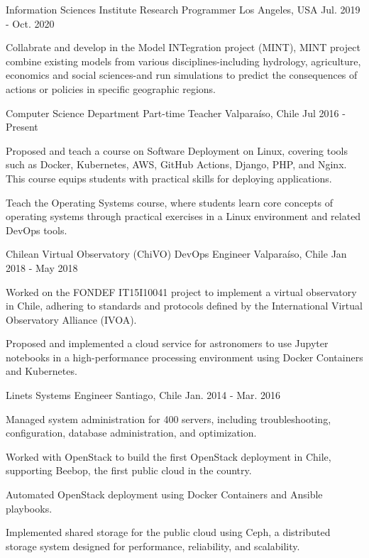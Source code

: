 \begin{cventries}
  \cventry
    {Information Sciences Institute}
    {Research Programmer}
    {Los Angeles, USA}
    {Jul. 2019 - Oct. 2020}
    {
      \begin{cvitems}
        \item{Collabrate and develop in the Model INTegration project (MINT), MINT project combine existing models from various disciplines-including hydrology, agriculture, economics and social sciences-and run simulations to predict the consequences of actions or policies in specific geographic regions.}
      \end{cvitems}
    }

    \cventry
    {Computer Science Department}
    {Part-time Teacher}
    {Valparaíso, Chile}
    {Jul 2016 - Present}
    {
      \begin{cvitems}
        \item{Proposed and teach a course on Software Deployment on Linux, covering tools such as Docker, Kubernetes, AWS, GitHub Actions, Django, PHP, and Nginx. This course equips students with practical skills for deploying applications.}
        \item{Teach the Operating Systems course, where students learn core concepts of operating systems through practical exercises in a Linux environment and related DevOps tools.}
      \end{cvitems}
    }

  \cventry
  {Chilean Virtual Observatory (ChiVO)}
  {DevOps Engineer}
  {Valparaíso, Chile}
  {Jan 2018 - May 2018}
  {
    \begin{cvitems}
      \item{Worked on the FONDEF IT15I10041 project to implement a virtual observatory in Chile, adhering to standards and protocols defined by the International Virtual Observatory Alliance (IVOA).}
      \item{Proposed and implemented a cloud service for astronomers to use Jupyter notebooks in a high-performance processing environment using Docker Containers and Kubernetes.}
    \end{cvitems}
  }

  \cventry
    {Linets}
    {Systems Engineer}
    {Santiago, Chile}
    {Jan. 2014 - Mar. 2016}
    {
      \begin{cvitems}
        \item{Managed system administration for 400 servers, including troubleshooting, configuration, database administration, and optimization.}
        \item{Worked with OpenStack to build the first OpenStack deployment in Chile, supporting Beebop, the first public cloud in the country.}
        \item{Automated OpenStack deployment using Docker Containers and Ansible playbooks.}
        \item{Implemented shared storage for the public cloud using Ceph, a distributed storage system designed for performance, reliability, and scalability.}
      \end{cvitems}
    }


\end{cventries}
